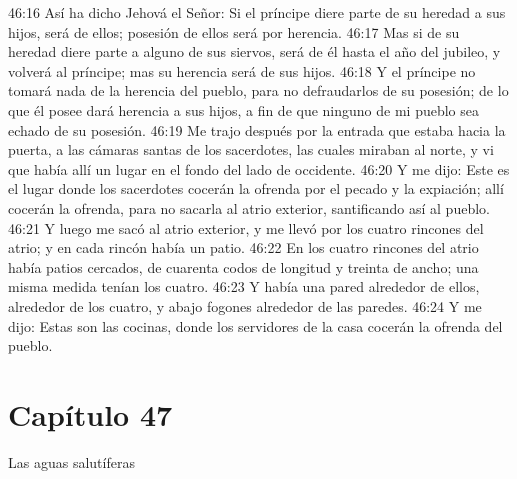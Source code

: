 46:16 Así ha dicho Jehová el Señor: Si el príncipe diere parte de su heredad a sus hijos, será de ellos; posesión de ellos será por herencia.   
46:17 Mas si de su heredad diere parte a alguno de sus siervos, será de él hasta el año del jubileo, y volverá al príncipe; mas su herencia será de sus hijos.   
46:18 Y el príncipe no tomará nada de la herencia del pueblo, para no defraudarlos de su posesión; de lo que él posee dará herencia a sus hijos, a fin de que ninguno de mi pueblo sea echado de su posesión.   
46:19 Me trajo después por la entrada que estaba hacia la puerta, a las cámaras santas de los sacerdotes, las cuales miraban al norte, y vi que había allí un lugar en el fondo del lado de occidente.   
46:20 Y me dijo: Este es el lugar donde los sacerdotes cocerán la ofrenda por el pecado y la expiación; allí cocerán la ofrenda, para no sacarla al atrio exterior, santificando así al pueblo.   
46:21 Y luego me sacó al atrio exterior, y me llevó por los cuatro rincones del atrio; y en cada rincón había un patio.   
46:22 En los cuatro rincones del atrio había patios cercados, de cuarenta codos   de longitud y treinta de ancho; una misma medida tenían los cuatro.   
46:23 Y había una pared alrededor de ellos, alrededor de los cuatro, y abajo fogones alrededor de las paredes.   
46:24 Y me dijo: Estas son las cocinas, donde los servidores de la casa cocerán la ofrenda del pueblo.   
\section*{Capítulo 47}  
Las aguas salutíferas   
  
